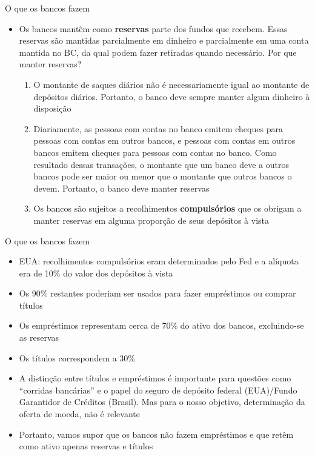 \documentclass[10pt]{beamer}
\begin{document}
\begin{frame}{O que os bancos fazem}
    \begin{itemize}
        \item Os bancos mantêm como \textbf{reservas} parte dos fundos que recebem. Essas reservas são mantidas parcialmente em dinheiro e parcialmente em uma conta mantida no BC, da qual podem fazer retiradas quando necessário. Por que manter reservas?\bigskip
        \begin{enumerate}
            \item O montante de saques diários não é necessariamente igual ao montante de depósitos diários. Portanto, o banco deve sempre manter algum dinheiro à disposição
            \medskip
            \item Diariamente, as pessoas com contas no banco emitem cheques para pessoas com contas em outros bancos, e pessoas com contas em outros bancos emitem cheques para pessoas com contas no banco. Como resultado dessas transações, o montante que um banco deve a outros bancos pode ser maior ou menor que o montante que outros bancos o devem. Portanto, o banco deve manter reservas
            \medskip
            \item Os bancos são sujeitos a recolhimentos \textbf{compulsórios} que os obrigam a manter reservas em alguma proporção de seus depósitos à vista
        \end{enumerate}
    \end{itemize}
\end{frame}

\begin{frame}{O que os bancos fazem}
    \begin{itemize}
        \item EUA: recolhimentos compulsórios eram determinados pelo Fed e a alíquota era de 10\% do valor dos depósitos à vista
        \bigskip
        \item Os 90\% restantes poderiam ser usados para fazer empréstimos ou comprar títulos
        \bigskip
        \item Os empréstimos representam cerca de 70\% do ativo dos bancos, excluindo-se as reservas
        \bigskip
        \item Os títulos correspondem a 30\%
        \bigskip
        \item A distinção entre títulos e empréstimos é importante para questões como ``corridas bancárias'' e o papel do seguro de depósito federal (EUA)/Fundo Garantidor de Créditos (Brasil). Mas para o nosso objetivo, determinação da oferta de moeda, não é relevante
        \bigskip
        \item Portanto, vamos supor que os bancos não fazem empréstimos e que retêm como ativo apenas reservas e títulos
    \end{itemize}
\end{frame}
\end{document}
